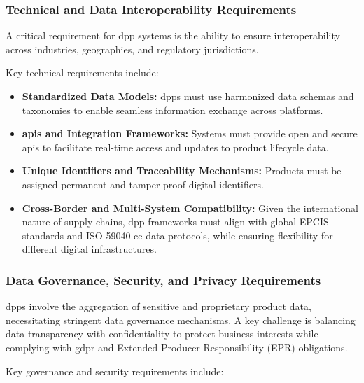 \subsubsection*{Technical and Data Interoperability Requirements}
A critical requirement for \ac{dpp} systems is the ability to ensure interoperability across industries, geographies, and regulatory jurisdictions. 

Key technical requirements include:

\begin{itemize}[itemsep=0.5\baselineskip]
    \item \textbf{Standardized Data Models:} \ac{dpp}s must use harmonized data schemas and taxonomies to enable seamless information exchange across platforms. \autocite{GS1inEurope.2025}

    \item \textbf{\ac{api}s and Integration Frameworks:} Systems must provide open and secure \ac{api}s to facilitate real-time access and updates to product lifecycle data. \autocite{Jansen.2023}

    \item \textbf{Unique Identifiers and Traceability Mechanisms:} Products must be assigned permanent and tamper-proof digital identifiers. \autocite{Berg.2022}

    \item \textbf{Cross-Border and Multi-System Compatibility:} Given the international nature of supply chains, \ac{dpp} frameworks must align with global EPCIS standards and ISO 59040 \ac{ce} data protocols, while ensuring flexibility for different digital infrastructures. \autocite{Sun.2025, Heemskerk.2025}
\end{itemize}

\subsubsection*{Data Governance, Security, and Privacy Requirements}
\ac{dpp}s involve the aggregation of sensitive and proprietary product data, necessitating stringent data governance mechanisms. A key challenge is balancing data transparency with confidentiality to protect business interests while complying with \ac{gdpr} and Extended Producer Responsibility (EPR) obligations. \autocite{Plociennik.2022, Jansen.2023}

Key governance and security requirements include:

